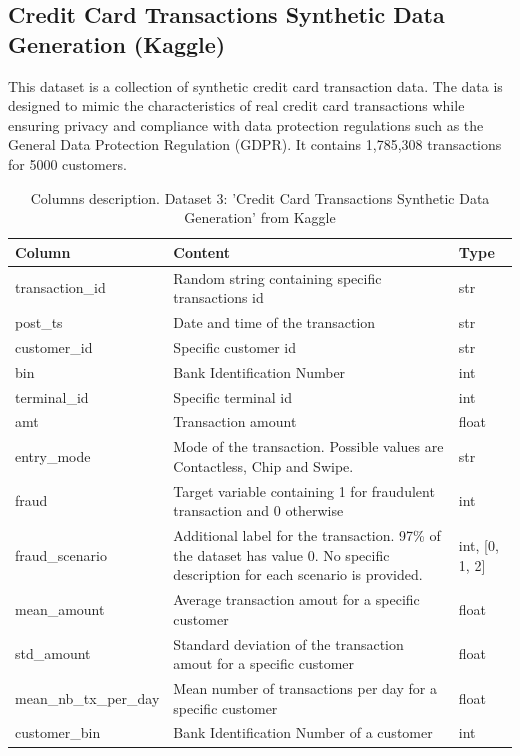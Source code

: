 \documentclass[12pt,a4paper, hidelinks]{article}
\begin{document}
\subsection{Credit Card Transactions Synthetic Data Generation (Kaggle)}

This dataset is a collection of synthetic credit card transaction data. The data is designed to mimic the characteristics of real credit card transactions while ensuring privacy and compliance with data protection regulations such as the General Data Protection Regulation (GDPR). It contains 1,785,308 transactions for 5000 customers.

\begin{table}[ht!]
    \centering
    \begin{tabular}{|p{4.5cm}|p{8cm}|p{2cm}|}
    \hline
    \textbf{Column} & \textbf{Content} & \textbf{Type} \\
    \hline
    transaction\_id & Random string containing specific transactions id & str \\
    \hline
    post\_ts & Date and time of the transaction & str \\
    \hline
    customer\_id & Specific customer id & str \\
    \hline
    bin & Bank Identification Number & int \\
    \hline
    terminal\_id & Specific terminal id & int \\
    \hline
    amt & Transaction amount & float \\
    \hline
    entry\_mode & Mode of the transaction. Possible values are Contactless, Chip and Swipe. & str \\
    \hline 
    fraud & Target variable containing 1 for fraudulent transaction and 0 otherwise & int \\
    \hline
    fraud\_scenario & Additional label for the transaction. 97\% of the dataset has value 0. No specific description for each scenario is provided.  & int, [0, 1, 2] \\
    \hline
    mean\_amount & Average transaction amout for a specific customer  & float \\
    \hline
    std\_amount & Standard deviation of the transaction amout for a specific customer  & float \\
    \hline
    mean\_nb\_tx\_per\_day & Mean number of transactions per day for a specific customer & float \\
    \hline
    customer\_bin & Bank Identification Number of a customer & int \\
    \hline
    \end{tabular}
    \caption{Columns description. Dataset 3: 'Credit Card Transactions Synthetic Data Generation' from Kaggle}
\end{table}
\end{document}
